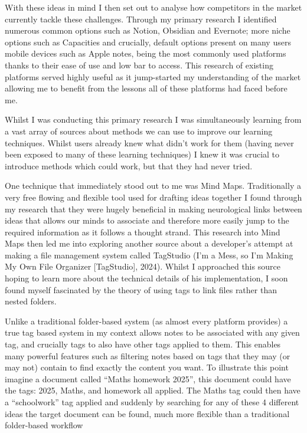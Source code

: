 With these ideas in mind I then set out to analyse how competitors in the market currently tackle these challenges. Through my primary research I identified numerous common options such as Notion, Obsidian and Evernote; more niche options such as Capacities and crucially, default options present on many users mobile devices such as Apple notes, being the most commonly used platforms thanks to their ease of use and low bar to access. This research of existing platforms served highly useful as it jump-started my understanding of the market allowing me to benefit from the lessons all of these platforms had faced before me.

Whilst I was conducting this primary research I was simultaneously learning from a vast array of sources about methods we can use to improve our learning techniques. Whilst users already knew what didn't work for them (having never been exposed to many of these learning techniques) I knew it was crucial to introduce methods which could work, but that they had never tried.

One technique that immediately stood out to me was Mind Maps. Traditionally a very free flowing and flexible tool used for drafting ideas together I found through my research that they were hugely beneficial in making neurological links between ideas that allows our minds to associate and therefore more easily jump to the required information as it follows a thought strand. This research into Mind Maps then led me into exploring another source about a developer's attempt at making a file management system called TagStudio (I'm a Mess, so I'm Making My Own File Organizer [TagStudio], 2024). Whilst I approached this source hoping to learn more about the technical details of his implementation, I soon found myself fascinated by the theory of using tags to link files rather than nested folders.

Unlike a traditional folder-based system (as almost every platform provides) a true tag based system in my context allows notes to be associated with any given tag, and crucially tags to also have other tags applied to them. This enables many powerful features such as filtering notes based on tags that they may (or may not) contain to find exactly the content you want. To illustrate this point imagine a document called “Maths homework 2025”, this document could have the tags: 2025, Maths, and homework all applied. The Maths tag could then have a “schoolwork” tag applied and suddenly by searching for any of these 4 different ideas the target document can be found, much more flexible than a traditional folder-based workflow

